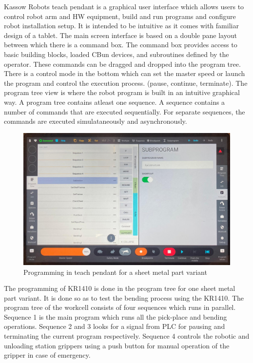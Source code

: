 Kassow Robots teach pendant is a graphical user interface which allows users
to control robot arm and HW equipment, build and run programs and configure robot installation setup.
It is intended to be intuitive as it comes with familiar design of a tablet. The main screen interface is based
on a double pane layout between which there is a command box. The command box provides access to basic building blocks,
loaded CBun devices, and subroutines defined by the operator. These commands can be dragged and dropped into the program
tree. \cite[page 15]{kassow-software-manual}
There is a control mode in the bottom which can set the master speed or launch the program and control the execution process. (pause, continue, terminate). The program tree view is where the robot program is built in an intuitive graphical way.
A program tree contains atleast one sequence. A sequence contains a number of commands that are executed sequentially.
For separate sequences, the commands are executed simulataneously and asynchronously. \cite[page 20]{kassow-software-manual}


\begin{figure}[h]
    \centering
    \includegraphics[width=\textwidth]{figures/programtree.png}
    \caption{Programming in teach pendant for a sheet metal part variant}
    \label{fig:programtree}
\end{figure}


The programming of KR1410 is done in the program tree for one sheet metal part variant.
It is done so as to test the bending process using the KR1410.
The program tree of the workcell consists of four sequences which runs in parallel.
Sequence 1 is the main program which runs all the pick-place and bending operations.
Sequence 2 and 3 looks for a signal from PLC for pausing and terminating the current program
respectively. Sequence 4 controls the robotic and unloading station grippers using a push button
for manual operation of the gripper in case of emergency.

